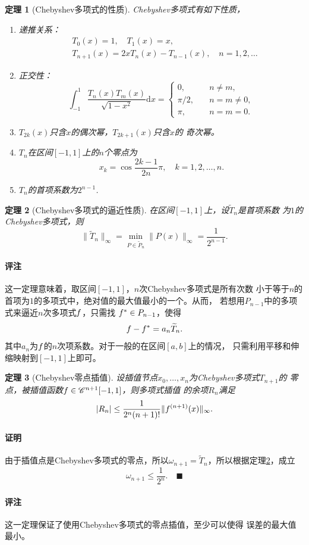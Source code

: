 \documentclass[12pt, a4paper]{article}
\theoremstyle{margin}
\newtheorem{thm}{定理}
\newcommand{\ms}{\mathscr}
\newcommand{\f}{\mathnormal{f}}
\newcommand{\rd}{\mathrm{d}}
\newcommand\thmref[1]{定理\ref{#1}}
\newcommand{\remark}{\paragraph{评注}}
\newcommand{\proof}{\paragraph{证明}}
\begin{document}
  \begin{thm}[Chebyshev多项式的性质]
    Chebyshev多项式有如下性质，
    \begin{enumerate}
      \item 递推关系：
      \[\begin{split}
        &T_0(x) = 1, \quad T_1(x) = x,\\
        &T_{n+1}(x) = 2xT_n(x) - T_{n-1}(x),\quad n =1,2,\dots
      \end{split}\]
      \item 正交性：
      \[
        \int_{-1}^1\frac{T_n(x)T_m(x)}{\sqrt{1-x^2}} \rd x =
        \begin{cases}
          0, &\quad n\ne m,\\
          \pi/2, &\quad n = m \ne 0,\\
          \pi,&\quad n = m = 0.
        \end{cases}
      \]
      \item $T_{2k}(x)$只含$x$的偶次幂，$T_{2k+1}(x)$只含$x$的
      奇次幂。
      \item $T_n$在区间$[-1, 1]$上的$n$个零点为
      \[
        x_k = \cos\frac{2k-1}{2n}\pi,\quad k = 1,2,\dots,n.
      \]
      \item $T_n$的首项系数为$2^{n-1}$.
    \end{enumerate}
  \end{thm}

  \begin{thm}[Chebyshev多项式的逼近性质]
    \label{thm: Chebyshev多项式的逼近性质}
    在区间$[-1,1]$上，设$\widetilde{T}_n$是首项系数
    为$1$的Chebyshev多项式，则
    \[
      \|\widetilde{T}_n\|_\infty = \min_{P\in\widetilde{P}_n}
      \|P(x)\|_\infty = \frac{1}{2^{n-1}}.
    \]
  \end{thm}
  \remark
    这一定理意味着，取区间$[-1, 1]$，$n$次Chebyshev多项式是所有次数
    小于等于$n$的首项为$1$的多项式中，绝对值的最大值最小的一个。从而，
    若想用$P_{n-1}$中的多项式来逼近$n$次多项式$\f$，只需找
    $\f^*\in P_{n-1}$，使得
    \[
      \f - \f^* = a_n \widetilde{T}_n.
    \]
    其中$a_n$为$\f$的$n$次项系数。对于一般的在区间$[a, b]$上的情况，
    只需利用平移和伸缩映射到$[-1, 1]$上即可。

  \begin{thm}[Chebyshev零点插值]
    设插值节点$x_0,\dots,x_n$为Chebyshev多项式$T_{n+1}$的
    零点，被插值函数$\f\in\ms{C}^{n+1}[-1, 1]$，则多项式插值
    的余项$R_n$满足
    \[
      |R_n| \le \frac{1}{2^n(n+1)!}\|\f^{(n+1)}(x)\|_{\infty}.
    \]
  \end{thm}
  \proof
    由于插值点是Chebyshev多项式的零点，所以$\omega_{n+1}=
    \widetilde{T}_n$，所以根据\thmref{thm: Chebyshev多项式的逼近性质}，成立
    \[
      \omega_{n+1} \le \frac{1}{2^n}.\quad\blacksquare
    \]
  \remark
    这一定理保证了使用Chebyshev多项式的零点插值，至少可以使得
    误差的最大值最小。
\end{document}
